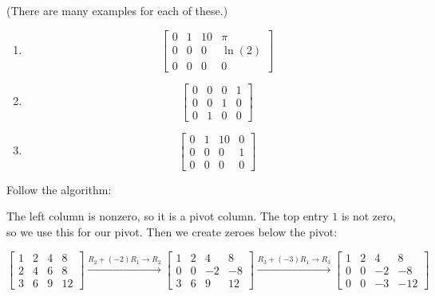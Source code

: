 \documentclass[12pt,letterpaper]{article}
\begin{document}
\begin{enumerate}
  \Answer (There are many examples for each of these.)
  \begin{enumerate}
  \item
    \[
      \left[
        \begin{array}{cccc}
          0&1&10&\pi\\
          0&0&0&\ln(2)\\
          0&0&0&0
        \end{array}
      \right]
    \]
  \item
    \[
      \left[
        \begin{array}{cccc}
          0&0&0&1\\
          0&0&1&0\\
          0&1&0&0
        \end{array}
      \right]
    \]
  \item
    \[
      \left[
        \begin{array}{cccc}
          0&1&10&0\\
          0&0&0&1\\
          0&0&0&0
        \end{array}
      \right]
    \]
  \end{enumerate}

  \Answer

  Follow the algorithm:

  The left column is nonzero, so it is a pivot column. The top entry $1$ is not zero, so we use this for our pivot. Then we create zeroes below the pivot:

  \[
    \left[
      \begin{array}{cccc}
        1&2&4&8\\
        2&4&6&8\\
        3&6&9&12
      \end{array}
    \right]\xrightarrow{R_2+(-2)R_1\rightarrow R_2}
    \left[
      \begin{array}{cccc}
        1&2&4&8\\
        0&0&-2&-8\\
        3&6&9&12
      \end{array}
    \right]\xrightarrow{R_3+(-3)R_1\rightarrow R_3}
    \left[
      \begin{array}{cccc}
        1&2&4&8\\
        0&0&-2&-8\\
        0&0&-3&-12
      \end{array}
    \right]
  \]


\end{enumerate}
\end{document}
